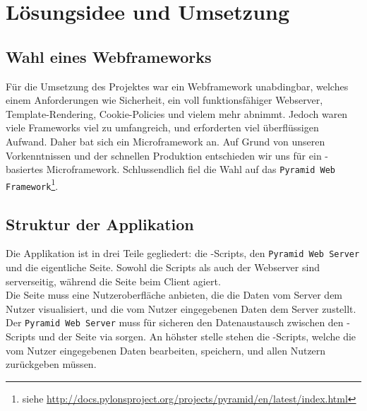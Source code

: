 \chapter{Lösungsidee und Umsetzung}
\section{Wahl eines Webframeworks}
Für die Umsetzung des Projektes war ein Webframework unabdingbar, welches einem Anforderungen wie Sicherheit,  %
ein voll funktionsfähiger Webserver, Template-Rendering, Cookie-Policies und vielem mehr abnimmt. Jedoch waren %
viele Frameworks viel zu umfangreich, und erforderten viel überflüssigen Aufwand. Daher bat sich ein Microframework
an. Auf Grund von unseren Vorkenntnissen und der schnellen Produktion entschieden wir uns für ein \Python-basiertes
Microframework.
Schlussendlich fiel die Wahl auf das \texttt{Pyramid Web Framework}\footnote{siehe \url{http://docs.pylonsproject.org/projects/pyramid/en/latest/index.html}}.

\section{Struktur der Applikation}
Die Applikation ist in drei Teile gegliedert: die \Python-Scripts, den \texttt{Pyramid Web Server} und die eigentliche Seite.
Sowohl die Scripts als auch der Webserver sind serverseitig, während die Seite beim Client agiert.\\
Die Seite muss eine Nutzeroberfläche anbieten, die die Daten vom Server dem Nutzer visualisiert, und die vom
Nutzer eingegebenen Daten dem Server zustellt. Der \texttt{Pyramid Web Server} muss für sicheren den Datenaustausch zwischen den 
\Python-Scripts und der Seite via sorgen. An höhster stelle stehen die \Python-Scripts, welche die vom Nutzer eingegebenen Daten
bearbeiten, speichern, und allen Nutzern zurückgeben müssen.

 
